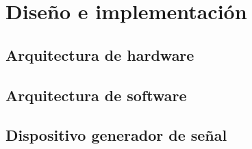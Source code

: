 \chapter{Diseño e implementación}

\label{cap:DisenioImplementacion}

\section{Arquitectura de hardware}
\section{Arquitectura de software}
\section{Dispositivo generador de señal}
